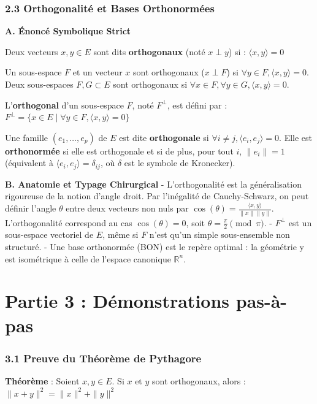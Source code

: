 \documentclass{report}
\begin{document}
\subsection*{2.3 Orthogonalité et Bases Orthonormées}

\textbf{A. Énoncé Symbolique Strict}

Deux vecteurs $x, y \in E$ sont dits \textbf{orthogonaux} (noté $x \perp y$) si :
$ \langle x, y \rangle = 0 $

Un sous-espace $F$ et un vecteur $x$ sont orthogonaux ($x \perp F$) si $\forall y \in F, \langle x, y \rangle = 0$.
Deux sous-espaces $F, G \subset E$ sont orthogonaux si $\forall x \in F, \forall y \in G, \langle x, y \rangle = 0$.

L'\textbf{orthogonal} d'un sous-espace $F$, noté $F^\perp$, est défini par :
$ F^\perp = \{x \in E \mid \forall y \in F, \langle x, y \rangle = 0\} $

Une famille $(e_1, \ldots, e_p)$ de $E$ est dite \textbf{orthogonale} si $\forall i \neq j, \langle e_i, e_j \rangle = 0$.
Elle est \textbf{orthonormée} si elle est orthogonale et si de plus, pour tout $i$, $\|e_i\| = 1$ (équivalent à $\langle e_i, e_j \rangle = \delta_{ij}$, où $\delta$ est le symbole de Kronecker).

\textbf{B. Anatomie et Typage Chirurgical}
- L'orthogonalité est la généralisation rigoureuse de la notion d'angle droit. Par l'inégalité de Cauchy-Schwarz, on peut définir l'angle $\theta$ entre deux vecteurs non nuls par $\cos(\theta) = \frac{\langle x, y \rangle}{\|x\| \|y\|}$. L'orthogonalité correspond au cas $\cos(\theta) = 0$, soit $\theta = \frac{\pi}{2} \pmod \pi$.
- $F^\perp$ est un sous-espace vectoriel de $E$, même si $F$ n'est qu'un simple sous-ensemble non structuré.
- Une base orthonormée (BON) est le repère optimal : la géométrie y est isométrique à celle de l'espace canonique $\mathbb{R}^n$.

\chapter*{Partie 3 : Démonstrations pas-à-pas}

\subsection*{3.1 Preuve du Théorème de Pythagore}

\textbf{Théorème} :
Soient $x, y \in E$. Si $x$ et $y$ sont orthogonaux, alors :
$ \|x + y\|^2 = \|x\|^2 + \|y\|^2 $
\end{document}

